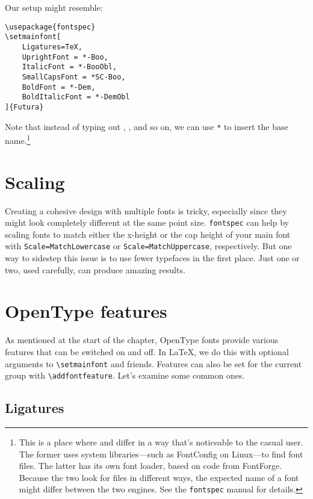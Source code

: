 \noindent Our setup might resemble:
\begin{leftfigure}
\begin{lstlisting}
\usepackage{fontspec}
\setmainfont[
    Ligatures=TeX,
    UprightFont = *-Boo,
    ItalicFont = *-BooObl,
    SmallCapsFont = *SC-Boo,
    BoldFont = *-Dem,
    BoldItalicFont = *-DemObl
]{Futura}
\end{lstlisting}
\end{leftfigure}
Note that instead of typing out ,
, and so on, we can use \texttt{*} to insert the base
name.\punckern\footnote{This is
a place where \XeLaTeX{} and \LuaLaTeX{}
differ in a way that's noticeable to the casual user.
The former uses system libraries---such as FontConfig on Linux---to
find font files.
The latter has its own font loader,
based on code from FontForge.\punckern{}
Because the two look for files in different ways,
the expected name of a font might differ between the two engines.
See the \texttt{fontspec} manual for details.}

\section{Scaling}

Creating a cohesive design with multiple fonts is tricky,
especially since they might look completely different
at the same point size.
\texttt{fontspec} can help by scaling fonts to match either the
x-height or the cap height of your main font with
\verb|Scale=MatchLowercase| or \verb|Scale=MatchUppercase|,
respectively.
But one way to sidestep this issue is to use fewer
typefaces in the first place.
Just one or two, used carefully, can produce amazing results.


\section{OpenType features}

As mentioned at the start of the chapter,
OpenType fonts provide various features that can be switched on and off.
In \LaTeX{}, we do this with optional arguments to
\verb|\setmainfont| and friends.
Features can also be set for the current group with
\verb|\addfontfeature|.
Let's examine some common ones.

\subsection{Ligatures}

